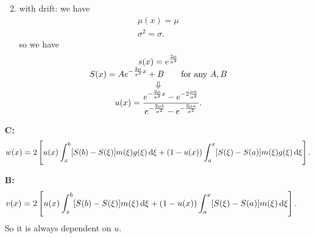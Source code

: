 \documentclass[12pt]{report}
\begin{document}
\begin{enumerate}[\bfseries A:]
\begin{enumerate}[\circlet]
\begin{equation*}
		\end{equation*}
		\item \bwm{} with drift: we have
		\begin{equation*}
			\begin{array}{c}
				\mu(x)=\mu\\
				\sigma^{2}=\sigma.
			\end{array}
		\end{equation*}
		so we have
		\begin{equation*}
			\begin{array}{>{\displaystyle}c}
				s(x)=e^{\frac{2\mu}{\sigma^{2}}}\\
				S(x)=Ae^{-\frac{2\mu}{\sigma^{2}}x}+B\qquad\text{for any }A,B\\
				\Downarrow\\
				u(x)=\frac{e^{-\frac{2\mu}{\sigma^{2}}x}-e^{-2\frac{\mu a}{\sigma^{2}}}}{e^{-\frac{2\mu b}{\sigma^{2}}}-e^{-\frac{2\mu a}{\sigma^{2}}}}.
			\end{array}
		\end{equation*}
	\end{enumerate}
	\item[\bfseries C:]
	\begin{equation*}
		w(x)=2\left[u(x)\int_{x}^{b}[S(b)-S(\xi)]m(\xi)g(\xi)\mathop{}\!\mathrm{d}\xi+(1-u(x))\int_{a}^{x}[S(\xi)-S(a)]m(\xi)g(\xi)\mathop{}\!\mathrm{d}\xi\right].
	\end{equation*}
	\item[\bfseries B:]
	\begin{equation*}
		v(x)=2\left[u(x)\int_{x}^{b}[S(b)-S(\xi)]m(\xi)\mathop{}\!\mathrm{d}\xi+(1-u(x))\int_{a}^{x}[S(\xi)-S(a)]m(\xi)\mathop{}\!\mathrm{d}\xi\right].
	\end{equation*}
	So it is always dependent on $u$.
\end{enumerate}
\end{document}
